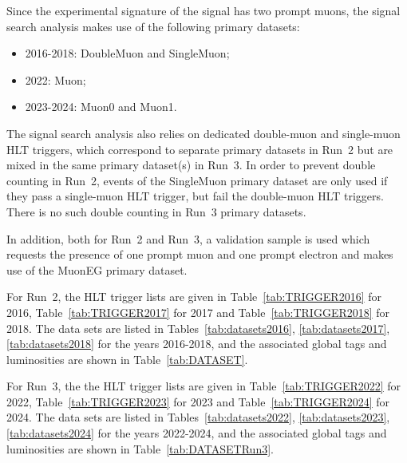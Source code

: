 \documentclass{cernatlasnote}
\begin{document}
\begin{appendices}
Since the experimental signature of the signal has two prompt muons, the signal search analysis makes use of the following primary datasets:
\begin{itemize}
    \item 2016-2018: DoubleMuon and SingleMuon;
    \item 2022: Muon;
    \item 2023-2024: Muon0 and Muon1.
\end{itemize}
The signal search analysis also relies on dedicated double-muon and single-muon HLT triggers, which correspond to separate primary datasets in Run~2 but are mixed in the same primary dataset(s) in Run~3.
In order to prevent double counting in Run~2, events of the SingleMuon primary dataset are only used if they pass a single-muon HLT trigger, but fail the double-muon HLT triggers. There is no such double counting in Run~3 primary datasets.

In addition, both for Run~2 and Run~3, a validation sample is used which requests the presence of one prompt muon and one prompt electron and makes use of the MuonEG primary dataset.

For Run~2, the HLT trigger lists are given in Table~\ref{tab:TRIGGER2016} for 2016, Table~\ref{tab:TRIGGER2017} for 2017 and Table~\ref{tab:TRIGGER2018} for 2018. 
The data sets are listed in Tables~\ref{tab:datasets2016}, \ref{tab:datasets2017}, \ref{tab:datasets2018} for the years 2016-2018, and the associated global tags and luminosities are shown in Table~\ref{tab:DATASET}.

For Run~3, the the HLT trigger lists are given in Table~\ref{tab:TRIGGER2022} for 2022, Table~\ref{tab:TRIGGER2023} for 2023 and Table~\ref{tab:TRIGGER2024} for 2024.
The data sets are listed in Tables~\ref{tab:datasets2022}, \ref{tab:datasets2023}, \ref{tab:datasets2024} for the years 2022-2024, and the associated global tags and luminosities are shown in Table~\ref{tab:DATASETRun3}. 


\end{appendices}
\end{document}
